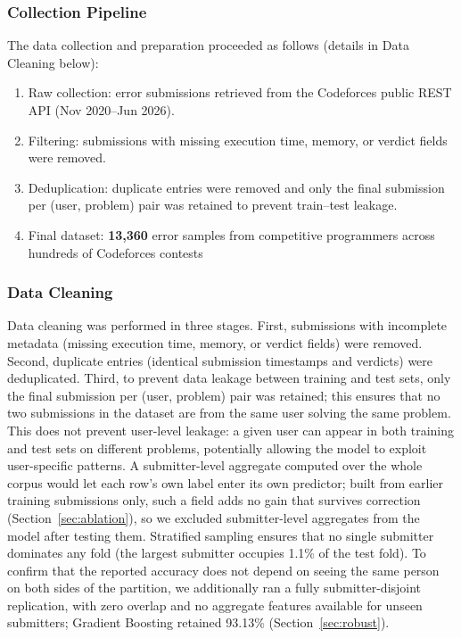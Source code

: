 \documentclass[acmsmall]{acmart}
\begin{document}
\subsubsection*{Collection Pipeline}
The data collection and preparation proceeded as follows (details in
Data Cleaning below):
\begin{enumerate}
 \item Raw collection: error submissions retrieved from the
 Codeforces public REST API (Nov 2020--Jun 2026).
 \item Filtering: submissions with missing execution time, memory, or
 verdict fields were removed.
 \item Deduplication: duplicate entries were removed and only the final
 submission per (user, problem) pair was retained to prevent
 train--test leakage.
 \item Final dataset: \textbf{13,360} error samples from competitive
 programmers across hundreds of Codeforces contests
\end{enumerate}

\subsubsection*{Data Cleaning}
Data cleaning was performed in three stages. First, submissions with
incomplete metadata (missing execution time, memory, or verdict fields) were
removed. Second, duplicate entries (identical submission timestamps and
verdicts) were deduplicated. Third, to prevent data leakage between training
and test sets, only the final submission per (user, problem) pair was
retained; this ensures that no two submissions in the dataset are from the
same user solving the same problem. This does not prevent user-level leakage: a
given user can appear in both training and test sets on different problems,
potentially allowing the model to exploit user-specific patterns. A
submitter-level aggregate computed over the whole corpus would let each row's
own label enter its own predictor; built from earlier training submissions
only, such a field adds no gain that survives correction
(Section~\ref{sec:ablation}), so we excluded submitter-level aggregates from
the model after testing them. Stratified sampling ensures that no single
submitter dominates any fold (the largest submitter occupies 1.1\% of the test
fold). To confirm that the
reported accuracy does not depend on seeing the same person on both sides of the
partition, we additionally ran a fully submitter-disjoint replication, with zero
overlap and no aggregate features available for unseen submitters; Gradient
Boosting retained 93.13\% (Section~\ref{sec:robust}).
\end{document}
